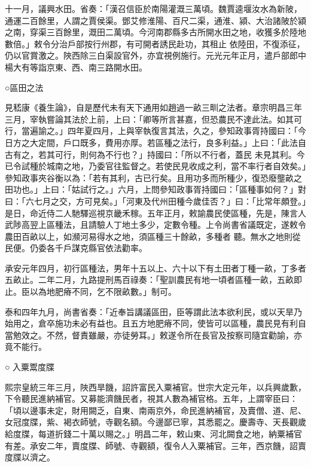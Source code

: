 \begin{pinyinscope}
 十一月，議興水田。省奏：「漢召信臣於南陽灌溉三萬頃。魏賈逵堰汝水為新陂，通運二百餘里，人謂之賈侯渠。鄧艾修淮陽、百尺二渠，通淮、潁、大治諸陂於潁之南，穿渠三百餘里，溉田二萬頃。今河南郡縣多古所開水田之地，收獲多於陸地數倍。」敕令分治戶部按行州郡，有可開者誘民赴功，其租止
 依陸田，不復添征，仍以官賞激之。陜西除三白渠設官外，亦宜視例施行。元光元年正月，遣戶部郎中楊大有等詣京東、西、南三路開水田。



 ○區田之法



 見嵇康《養生論》，自是歷代未有天下通用如趙過一畝三甽之法者。章宗明昌三年三月，宰執嘗論其法於上前，上曰：「卿等所言甚嘉，但恐農民不達此法。如其可行，當遍諭之。」四年夏四月，上與宰執復言其法，久之，參知政事胥持國曰：「今日方之大定間，戶口既多，費用亦厚。若區種之法行，良多利益。」上曰：「此法自古有之，若其可行，則何為不行也？」持國曰：「所以不行者，蓋民
 未見其利。今已令試種於城南之地，乃委官往監督之。若使民見收成之利，當不率行者自效矣。」參知政事夾谷衡以為：「若有其利，古已行矣。且用功多而所種少，復恐廢壟畝之田功也。」上曰：「姑試行之。」六月，上問參知政事胥持國曰：「區種事如何？」對曰：「六七月之交，方可見矣。」「河東及代州田種今歲佳否？」曰：「比常年頗登。」是日，命近侍二人馳驛巡視京畿禾稼。五年正月，敕諭農民使區種，先是，陳言人武陟高翌上區種法，且請驗人丁地土多少，定數令種。上令尚書省議既定，遂敕令農田百畝以上，如瀕河易得水之地，須區種三十餘畝，多種者
 聽。無水之地則從民便。仍委各千戶謀克縣官依法勸率。



 承安元年四月，初行區種法，男年十五以上、六十以下有土田者丁種一畝，丁多者五畝止。二年二月，九路提刑馬百祿奏：「聖訓農民有地一頃者區種一畝，五畝即止。臣以為地肥瘠不同，乞不限畝數。」制可。



 泰和四年九月，尚書省奏：「近奉旨講議區田，臣等謂此法本欲利民，或以天旱乃始用之，倉卒施功未必有益也。且五方地肥瘠不同，使皆可以區種，農民見有利自當勉效之。不然，督責雖嚴，亦徒勞耳。」敕遂令所在長官及按察司隨宜勸諭，亦竟不能行。



 ○
 入粟鬻度牒



 熙宗皇統三年三月，陜西旱饑，詔許富民入粟補官。世宗大定元年，以兵興歲歉，下令聽民進納補官。又募能濟饑民者，視其人數為補官格。五年，上謂宰臣曰：「頃以邊事未定，財用闕乏，自東、南兩京外，命民進納補官，及賣僧、道、尼、女冠度牒，紫、褐衣師號，寺觀名額。今邊鄙已寧，其悉罷之。慶壽寺、天長觀歲給度牒，每道折錢二十萬以賜之。」明昌二年，敕山東、河北闕食之地，納粟補官有差。承安二年，賣度牒、師號、寺觀額，復令人入粟補官。三年，西京饑，詔賣度牒以濟之。




\end{pinyinscope}
